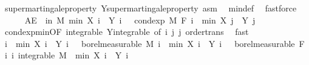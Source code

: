 \begin{isabellebody}
\ supermartingale{\isacharunderscore}{\kern0pt}property\ Y{\isachardot}{\kern0pt}supermartingale{\isacharunderscore}{\kern0pt}property\ asm\ \isamarkupfalse%
\ min{\isacharunderscore}{\kern0pt}def\ \isamarkupfalse%
\ fastforce\isanewline
\ \ \ \ \isamarkupfalse%
\ {\isachardoublequoteopen}AE\ {\isasymxi}\ in\ M{\isachardot}{\kern0pt}\ min\ {\isacharparenleft}{\kern0pt}X\ i\ {\isasymxi}{\isacharparenright}{\kern0pt}\ {\isacharparenleft}{\kern0pt}Y\ i\ {\isasymxi}{\isacharparenright}{\kern0pt}\ {\isasymge}\ cond{\isacharunderscore}{\kern0pt}exp\ M\ {\isacharparenleft}{\kern0pt}F\ i{\isacharparenright}{\kern0pt}\ {\isacharparenleft}{\kern0pt}{\isasymlambda}{\isasymxi}{\isachardot}{\kern0pt}\ min\ {\isacharparenleft}{\kern0pt}X\ j\ {\isasymxi}{\isacharparenright}{\kern0pt}\ {\isacharparenleft}{\kern0pt}Y\ j\ {\isasymxi}{\isacharparenright}{\kern0pt}{\isacharparenright}{\kern0pt}\ {\isasymxi}{\isachardoublequoteclose}\ \isamarkupfalse%
\ cond{\isacharunderscore}{\kern0pt}exp{\isacharunderscore}{\kern0pt}min{\isacharbrackleft}{\kern0pt}OF\ integrable\ Y{\isachardot}{\kern0pt}integrable{\isacharcomma}{\kern0pt}\ of\ i\ j\ j{\isacharbrackright}{\kern0pt}\ order{\isachardot}{\kern0pt}trans\ \isamarkupfalse%
\ fast\isanewline
\ \ \isacommand{{\isacharbraceright}{\kern0pt}}\isamarkupfalse%
\isanewline
\ \ \isamarkupfalse%
\ {\isachardoublequoteopen}{\isasymAnd}i{\isachardot}{\kern0pt}\ {\isacharparenleft}{\kern0pt}{\isasymlambda}{\isasymxi}{\isachardot}{\kern0pt}\ min\ {\isacharparenleft}{\kern0pt}X\ i\ {\isasymxi}{\isacharparenright}{\kern0pt}\ {\isacharparenleft}{\kern0pt}Y\ i\ {\isasymxi}{\isacharparenright}{\kern0pt}{\isacharparenright}{\kern0pt}\ {\isasymin}\ borel{\isacharunderscore}{\kern0pt}measurable\ M{\isachardoublequoteclose}\ {\isachardoublequoteopen}{\isasymAnd}i{\isachardot}{\kern0pt}\ {\isacharparenleft}{\kern0pt}{\isasymlambda}{\isasymxi}{\isachardot}{\kern0pt}\ min\ {\isacharparenleft}{\kern0pt}X\ i\ {\isasymxi}{\isacharparenright}{\kern0pt}\ {\isacharparenleft}{\kern0pt}Y\ i\ {\isasymxi}{\isacharparenright}{\kern0pt}{\isacharparenright}{\kern0pt}\ {\isasymin}\ borel{\isacharunderscore}{\kern0pt}measurable\ {\isacharparenleft}{\kern0pt}F\ i{\isacharparenright}{\kern0pt}{\isachardoublequoteclose}\ {\isachardoublequoteopen}{\isasymAnd}i{\isachardot}{\kern0pt}\ integrable\ M\ {\isacharparenleft}{\kern0pt}{\isasymlambda}{\isasymxi}{\isachardot}{\kern0pt}\ min\ {\isacharparenleft}{\kern0pt}X\ i\ {\isasymxi}{\isacharparenright}{\kern0pt}\ {\isacharparenleft}{\kern0pt}Y\ i\ {\isasymxi}{\isacharparenright}{\kern0pt}{\isacharparenright}{\kern0pt}{\isachardoublequoteclose}\ \isamarkupfalse%

\end{isabellebody}
